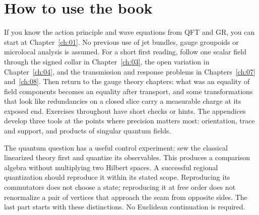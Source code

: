 \section*{How to use the book}
If you know the action principle and wave equations from QFT and GR, you can start at Chapter~\ref{ch:01}. No previous use of jet bundles, gauge groupoids or microlocal analysis is assumed. For a short first reading, follow one scalar field through the signed collar in Chapter~\ref{ch:03}, the open variation in Chapter~\ref{ch:04}, and the transmission and response problems in Chapters~\ref{ch:07} and~\ref{ch:08}. Then return to the gauge theory chapters: what was an equality of field components becomes an equality after transport, and some transformations that look like redundancies on a closed slice carry a measurable charge at its exposed end. Exercises throughout have short checks or hints. The appendices develop three tools at the points where precision matters most: orientation, trace and support, and products of singular quantum fields.

The quantum question has a useful control experiment: sew the classical linearized theory first and quantize its observables. This produces a comparison algebra without multiplying two Hilbert spaces. A successful regional quantization should reproduce it within its stated scope. Reproducing its commutators does not choose a state; reproducing it at free order does not renormalize a pair of vertices that approach the seam from opposite sides. The last part starts with these distinctions. No Euclidean continuation is required.

